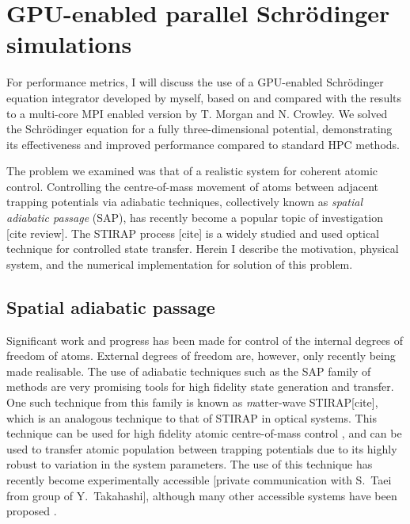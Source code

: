\section{GPU-enabled parallel Schr\"odinger simulations}
\label{sec:3D Stirap parallel Schr\"odinger simulations}
For performance metrics, I will discuss the use of a GPU-enabled Schr\"odinger equation integrator developed by myself, based on and compared with the results to a multi-core MPI enabled version by T. Morgan and N. Crowley. We solved the Schr\"odinger equation for a fully three-dimensional potential, demonstrating its effectiveness and improved performance compared to standard HPC methods.

The problem we examined was that of a realistic system for coherent atomic control. Controlling the centre-of-mass movement of atoms between adjacent trapping potentials via adiabatic techniques, collectively known as \textit{spatial adiabatic passage} (SAP), has recently become a popular topic of investigation [cite review]. The STIRAP process [cite] is a widely studied and used optical technique for controlled state transfer. Herein I describe the motivation, physical system, and the numerical implementation for solution of this problem.

\subsection{Spatial adiabatic passage}

Significant work and progress has been made for control of the internal degrees of freedom of atoms. External degrees of freedom are, however, only recently being made realisable. The use of adiabatic techniques such as the SAP family of methods are very promising tools for high fidelity state generation and transfer. One such technique from this family is known as {\textit matter-wave STIRAP}[cite], which is an analogous technique to that of STIRAP in optical systems. This technique can be used for high fidelity atomic centre-of-mass control \cite{Eckert:04}, and can be used to transfer atomic population between trapping potentials due to its highly robust to variation in the system parameters. The use of this technique has recently become experimentally accessible [private communication with S.~Taei from group of Y.~Takahashi], although many other accessible systems have been proposed \cite{Eckert:06,Morgan:11,Kohler:13}.


